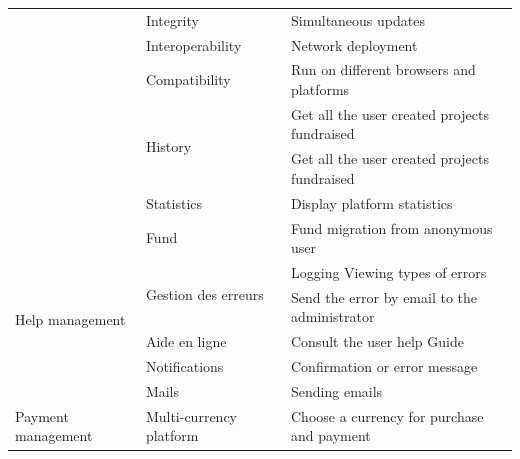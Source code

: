 \begin{longtable}{|m{10em}|m{10em}|m{10em}|}
                                           & \multirow{1}{*}{Integrity}               & Simultaneous updates                                       \\\cline{2-3}
                                           & \multirow{1}{*}{Interoperability}        & Network deployment                                         \\\cline{2-3}
                                           & \multirow{1}{*}{Compatibility}           & Run on different browsers and platforms                    \\\cline{2-3}
                                           & \multirow{2}{*}{History}                 & Get all the user created projects fundraised               \\\cline{3-3}
                                           &                                          & Get all the user created projects fundraised               \\\cline{2-3}
                                           & \multirow{1}{*}{Statistics}              & Display platform statistics                                \\\cline{2-3}
                                           & \multirow{1}{*}{Fund}                    & Fund migration from anonymous user                         \\\hline
      \multirow{4}{*}{Help management}     & \multirow{2}{*}{Gestion des erreurs}     & Logging Viewing types of errors                            \\\cline{3-3}
                                           &                                          & Send the error by email to the administrator               \\\cline{2-3}
                                           & \multirow{1}{*}{Aide en ligne}           & Consult the user help Guide                                \\\cline{2-3}
                                           & \multirow{1}{*}{Notifications}           & Confirmation or error message                              \\\cline{2-3}
                                           & \multirow{1}{*}{Mails}                   & Sending emails                                             \\\hline
      \multirow{2}{*}{Payment management}  & \multirow{1}{*}{Multi-currency platform} & Choose a currency for purchase and payment                 \\\cline{2-3}

\end{longtable}
